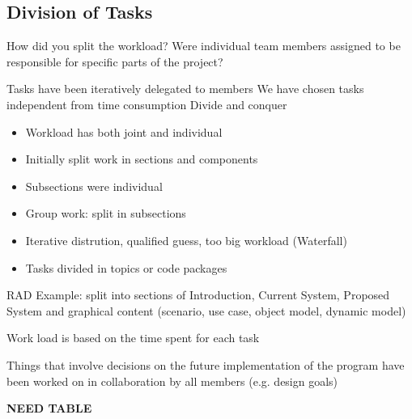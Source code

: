 \subsection{Division of Tasks}

How did you split the workload? Were individual team members assigned to be responsible for specific parts of the project?

Tasks have been iteratively delegated to members 
We have chosen tasks independent from time consumption
Divide and conquer 
\begin{itemize}
	\item Workload has both joint and individual 
	\item Initially split work in sections and components 
	\item Subsections were individual 
	\item Group work: split in subsections 
	\item Iterative distrution, qualified guess, too big workload (Waterfall) 
	\item Tasks divided in topics or code packages 
\end{itemize}

RAD Example: split into sections of Introduction, Current System, Proposed System and graphical content (scenario, use case, object model, dynamic model)

Work load is based on the time spent for each task 

Things that involve decisions on the future implementation of the program have been worked on in collaboration by all members (e.g. design goals)


\textbf{NEED TABLE}

